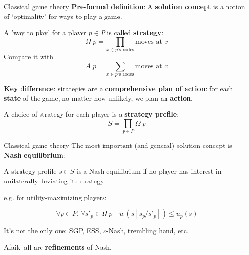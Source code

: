 \begin{frame}{Classical game theory}
	\textbf{Pre-formal definition}: A \textbf{solution concept} is a notion of `optimality' for ways to play a game.

	A 'way to play' for a player $p \in P$ is called \textbf{strategy}:
	\begin{equation*}
		\Omega\; p = \prod_{x \in \text{$p$'s nodes}} \text{moves at $x$}
	\end{equation*}
	Compare it with
	\begin{equation*}
		A\; p = \sum_{x \in \text{$p$'s nodes}} \text{moves at $x$}
	\end{equation*}

	\textbf{Key difference}: strategies are a \textbf{comprehensive plan of action}: for each \textbf{state} of the game, no matter how unlikely, we plan an \textbf{action}.

	A choice of strategy for each player is a \textbf{strategy profile}:
	\begin{equation*}
		S = \prod_{p \in P} \Omega\; p
	\end{equation*}
\end{frame}

\begin{frame}{Classical game theory}
	The most important (and general) solution concept is \textbf{Nash equilibrium}:

	\vfill
	\begin{definition}
		A strategy profile $s \in S$ is a Nash equilibrium if no player has interest in unilaterally deviating its strategy.
	\end{definition}

	\vfill
	e.g. for utility-maximizing players:

	\begin{equation*}
		\forall p \in P,\, \forall s'_p \in \Omega\; p \quad u_i(s[s_p/s'_p]) \leq u_p(s)
	\end{equation*}

	\vfill
	It's not the only one: SGP, ESS, $\varepsilon$-Nash, trembling hand, etc.

	Afaik, all are \textbf{refinements} of Nash.
\end{frame}

